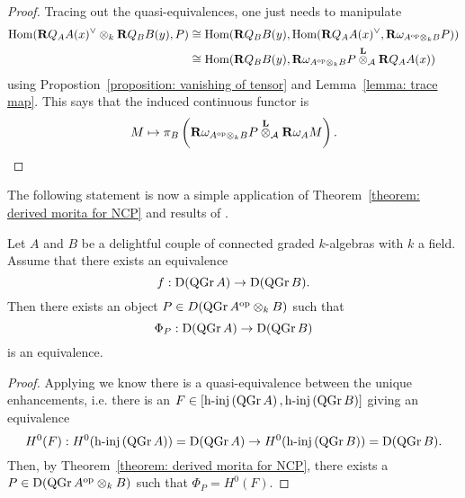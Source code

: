 \begin{proof}
  Tracing out the quasi-equivalences, one just needs to manipulate 
  \begin{align*}
    \operatorname{Hom} (\mathbf{R}Q_A A(x)^\vee \otimes_k \mathbf{R}Q_B B(y), P) & \cong \operatorname{Hom} ( \mathbf{R}Q_B B(y) , \operatorname{Hom}( \mathbf{R}Q_A A(x)^\vee, \mathbf{R}\omega_{A^{\operatorname{op}} \otimes_k B} P)) \\
    & \cong \operatorname{Hom} ( \mathbf{R}Q_B B(y) , \mathbf{R}\omega_{A^{\operatorname{op}} \otimes_k B} P \overset{\mathbf{L}}{\otimes}_{\mathcal A} \mathbf{R}Q_A A(x) ) 
  \end{align*}
  using Propostion~\ref{proposition: vanishing of tensor} and Lemma~\ref{lemma: trace map}. This says that the induced continuous functor is
  \begin{displaymath}
    M \mapsto \pi_B \left( \mathbf{R}\omega_{A^{\operatorname{op}} \otimes_k B} P \overset{\mathbf{L}}{\otimes}_{\mathcal A} \mathbf{R}\omega_A M \right). 
  \end{displaymath}
\end{proof}

The following statement is now a simple application of Theorem~\ref{theorem: derived morita for NCP} and results of \parencite{Lunts-Orlov}. 

\begin{corollary} \label{corollary: NCP morita}
  Let \(A\) and \(B\) be a delightful couple of connected graded \(k\)-algebras with \(k\) a field. Assume that there exists an equivalence
  \begin{displaymath}
    f : \mathrm{D} (\operatorname{QGr}A) \to \mathrm{D} (\operatorname{QGr}B).
  \end{displaymath}
  Then there exists an object \(P \in D ( \operatorname{QGr}A^{\operatorname{op}} \otimes_k B )\) such that 
  \begin{displaymath}
    \Phi_P : \mathrm{D} ( \operatorname{QGr}A) \to \mathrm{D} (\operatorname{QGr}B )
  \end{displaymath}
  is an equivalence.
\end{corollary}

\begin{proof}
  Applying \parencite[Theorem 1]{Lunts-Orlov} we know there is a quasi-equivalence between the unique enhancements, i.e. there is an \( F \in [ \operatorname{h-inj}\left( \operatorname{QGr}A\right), \operatorname{h-inj}\left( \operatorname{QGr}B\right) ]\) giving an equivalence
  \begin{displaymath}
    H^0(F) : H^0(\operatorname{h-inj}\left( \operatorname{QGr}A \right)) = \mathrm{D}(\operatorname{QGr}A) \to H^0(\operatorname{h-inj}\left( \operatorname{QGr}B \right)) = \mathrm{D}(\operatorname{QGr}B).
  \end{displaymath}
  Then, by Theorem~\ref{theorem: derived morita for NCP}, there exists a \(P \in \mathrm{D}(\operatorname{QGr}A^{\operatorname{op}} \otimes_k B)\) such that \(\Phi_P = H^0(F)\). 
\end{proof}

